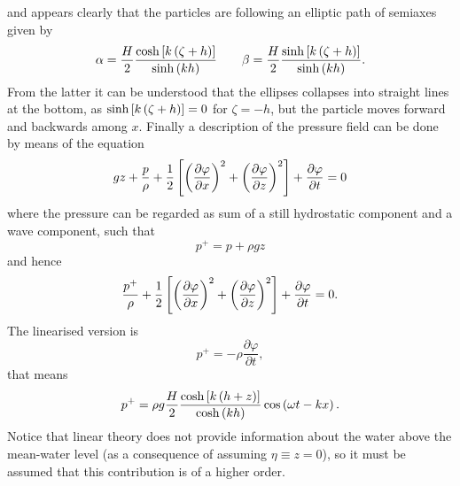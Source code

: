 and appears clearly that the particles are following an elliptic path of semiaxes given by
\begin{equation*}
\alpha=\dfrac{H}{2}\dfrac{\cosh\left[ k \left( \zeta+h \right) \right]}{\sinh\left( k  h \right)}
\qquad \beta=\dfrac{H}{2}\dfrac{\sinh\left[ k \left( \zeta+h \right) \right]}{\sinh\left( k  h \right)}.
\end{equation*}
From the latter it can be understood that the ellipses collapses into straight lines at the bottom, as $\sinh\left[ k\left( \zeta +h \right) \right]=0$ for $\zeta=-h$, but the particle moves forward and backwards among $x$. Finally a description of the pressure field can be done by means of the equation
\begin{equation*}
gz + \dfrac{p}{\rho} + \dfrac{1}{2}\left[ \left( \dfrac{\partial\varphi}{\partial x} \right)^{2}+\left( \dfrac{\partial\varphi}{\partial z} \right)^{2} \right] +\dfrac{\partial \varphi}{\partial t}=0
\end{equation*}
where the pressure can be regarded as sum of a still hydrostatic component and a wave component, such that
\begin{equation*}
p^{+}=p+\rho gz
\end{equation*}
and hence
\begin{equation}
\dfrac{p^{+}}{\rho} + \dfrac{1}{2}\left[ \left( \dfrac{\partial\varphi}{\partial x} \right)^{2}+\left( \dfrac{\partial\varphi}{\partial z} \right)^{2} \right] +\dfrac{\partial \varphi}{\partial t}=0.
\end{equation}
The linearised version is 
\begin{equation}
p^{+}=-\rho\dfrac{\partial \varphi}{\partial t},
\end{equation}
that means 
\begin{equation}
p^{+}=\rho g\dfrac{H}{2}\dfrac{\cosh\left[ k\left( h+z \right) \right]}{\cosh\left( kh \right)}\cos\left( \omega t -kx \right).
\end{equation}
Notice that linear theory does not provide information about the water above the mean-water level (as a consequence of assuming $\eta\equiv z=0$), so it must be assumed that this contribution is of a higher order.
